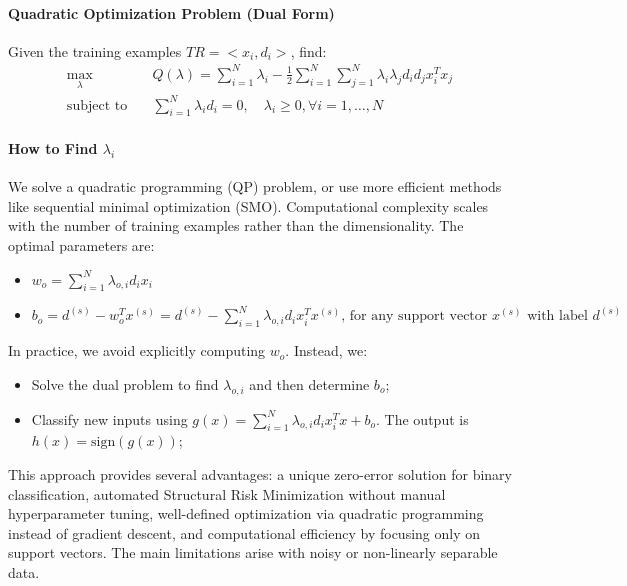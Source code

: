 \paragraph{Quadratic Optimization Problem (Dual Form)}
Given the training examples $TR = < x_i,d_i >$, find:
\begin{align*}
    \max_{\lambda} \quad & Q(\lambda) = \sum_{i=1}^N \lambda_i - \frac{1}{2} \sum_{i=1}^N \sum_{j=1}^N \lambda_i \lambda_j d_i d_j x_i^T x_j \\
    \text{subject to} \quad & \sum_{i=1}^N \lambda_i d_i = 0, \quad \lambda_i \geq 0, \forall i = 1,\dots,N
\end{align*}
\paragraph{How to Find $\lambda_i$}
We solve a quadratic programming (QP) problem, or use more efficient methods like sequential minimal optimization (SMO). Computational complexity scales with the number of training examples rather than the dimensionality. The optimal parameters are:
\begin{itemize}
    \item $    w_o = \sum_{i=1}^N \lambda_{o,i} d_i x_i$
    \item $    b_o = d^{(s)} - w_o^T x^{(s)} = d^{(s)} - \sum_{i=1}^N \lambda_{o,i} d_i x_i^T x^{(s)} \text{, for any support vector } x^{(s)} \text{ with label } d^{(s)}$
\end{itemize}

In practice, we avoid explicitly computing $w_o$. Instead, we:
\begin{itemize}
    \item [1.] Solve the dual problem to find $\lambda_{o,i}$ and then determine $b_o$;
    \item [2.] Classify new inputs using $g(x) = \sum_{i=1}^N \lambda_{o,i} d_i x_i^T x + b_o$. The output is $h(x) = \text{sign}(g(x))$;
\end{itemize}

This approach provides several advantages: a unique zero-error solution for binary classification, automated Structural Risk Minimization without manual hyperparameter tuning, well-defined optimization via quadratic programming instead of gradient descent, and computational efficiency by focusing only on support vectors. The main limitations arise with noisy or non-linearly separable data.

